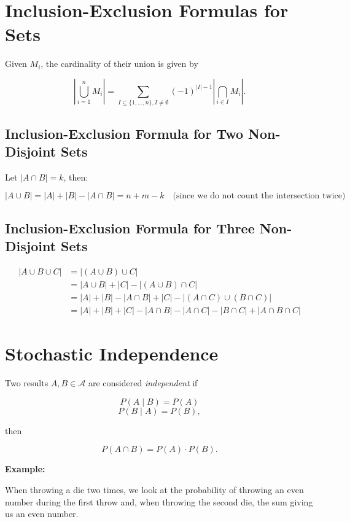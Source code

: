 \QED

\section{Inclusion-Exclusion Formulas for Sets}

Given \(M_i\), the cardinality of their union is given by


\[
	\left\vert \bigcup_{i = 1}^n M_i \right\vert  = \sum_{I \subseteq \{1, \dots, n\}, I \neq \emptyset}
	{(-1)}^{|I| - 1} \left\vert \bigcap_{i \in I} M_i \right\vert.
\]


\subsection{Inclusion-Exclusion Formula for Two Non-Disjoint Sets}

Let \( |A \cap B| = k \), then:

\[
	|A \cup B| = |A| + |B| - |A \cap B| = n + m - k \quad \text{(since we do not count the intersection 
	twice)}
\]

\subsection{Inclusion-Exclusion Formula for Three Non-Disjoint Sets}

\begin{align*}
	|A \cup B \cup C| &= |(A \cup B) \cup C| \\ 
	&= |A \cup B| + |C| - |(A \cup B) \cap C| \\
 	&= |A| + |B| - |A \cap B| + |C| - |(A \cap C) \cup (B \cap C)|\\
	&= |A| + |B| + |C| - |A \cap B| - |A \cap C| - |B \cap C| + |A \cap B \cap C|
\end{align*}


\section{Stochastic Independence} 

Two results \(A, B \in \mathcal{A}\) are considered \emph{independent} if 

\[
    P (A \mid B) = P (A)
\]
\[
    P (B \mid A) = P (B),
\]

then 

\[
    P(A \cap B) = P(A) \cdot P(B).
\]


\textbf{Example:}

When throwing a die two times, we look at the probability of throwing an even number during the first throw 
and, when throwing the second die, the sum giving us an even number. 

